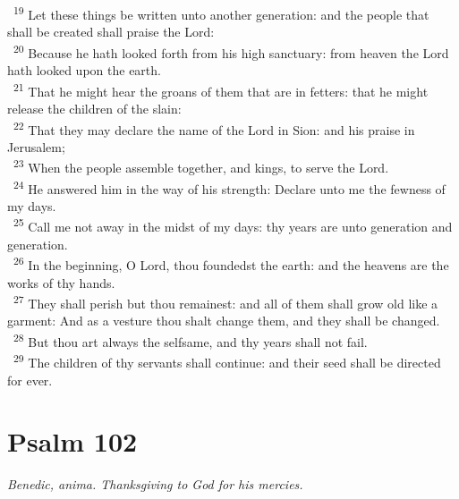 \documentclass[a5paper,12pt]{article}
\begin{document}
\begin{multicols*}{2}
~\textsuperscript{19} Let these things be written unto another generation: and the people that shall be created shall praise the Lord:\\
~\textsuperscript{20} Because he hath looked forth from his high sanctuary: from heaven the Lord hath looked upon the earth.\\
~\textsuperscript{21} That he might hear the groans of them that are in fetters: that he might release the children of the slain:\\
~\textsuperscript{22} That they may declare the name of the Lord in Sion: and his praise in Jerusalem;\\
~\textsuperscript{23} When the people assemble together, and kings, to serve the Lord.\\
~\textsuperscript{24} He answered him in the way of his strength: Declare unto me the fewness of my days.\\
~\textsuperscript{25} Call me not away in the midst of my days: thy years are unto generation and generation.\\
~\textsuperscript{26} In the beginning, O Lord, thou foundedst the earth: and the heavens are the works of thy hands.\\
~\textsuperscript{27} They shall perish but thou remainest: and all of them shall grow old like a garment: And as a vesture thou shalt change them, and they shall be changed.\\
~\textsuperscript{28} But thou art always the selfsame, and thy years shall not fail.\\
~\textsuperscript{29} The children of thy servants shall continue: and their seed shall be directed for ever.\\

\section{Psalm 102}
\label{sec:orga5b5f2c}
\emph{Benedic, anima. Thanksgiving to God for his mercies.}\\


\end{multicols*}
\end{document}
